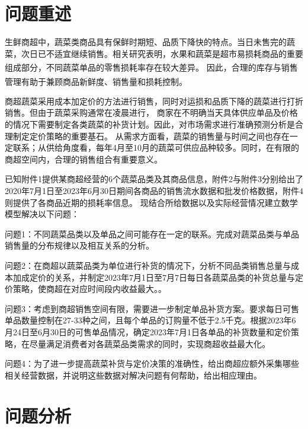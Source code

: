 \documentclass[withoutpreface,bwprint]{cumcmthesis} %
\numberwithin{equation}{section}
\begin{document}


\section{问题重述}

生鲜商超中，蔬菜类商品具有保鲜时期短、品质下降快的特点。当日未售完的蔬菜，次日已不适宜继续销售。相关研究表明，水果和蔬菜是超市易损耗商品的重要组成部分，不同蔬菜单品的零售损耗率存在较大差异\textsuperscript{\cite{buzby2015produce}}。
因此，合理的库存与销售管理有助于兼顾商品新鲜度、销售量和损耗控制\textsuperscript{\cite{broekmeulen2019foodwaste}}。

商超蔬菜采用成本加定价的方法进行销售，同时对运损和品质下降的蔬菜进行打折销售。但由于蔬菜采购通常在凌晨进行，
商家在不明确当天具体供应单品及价格的情况下需要制定各类蔬菜的补货计划。因此，对市场需求进行准确预测分析是合理制定定价策略的重要基石。
从需求方面看，蔬菜的销售量与时间之间也存在一定联系；从供给角度看，每年4月至10月的蔬菜可供应品种较多。同时，在有限的商超空间内，合理的销售组合有重要意义。

已知附件1提供某商超经营的6个蔬菜品类及其商品信息，附件2与附件3分别给出了2020年7月1日至2023年6月30日期间各商品的销售流水数据和批发价格数据，附件4则提供了各商品近期的损耗率信息。
现结合所给数据以及实际经营情况建立数学模型解决以下问题：

问题1：不同蔬菜品类以及单品之间可能存在一定的联系。完成对蔬菜品类与单品销售量的分布规律以及相互关系的分析。

问题2：在商超以蔬菜品类为单位进行补货的情况下，分析不同品类销售总量与成本加成定价的关系，并制定2023年7月1日至7月7日每日各蔬菜品类的补货总量与定价策略，使商超在对应时间段内收益最大。。

问题3：考虑到商超销售空间有限，需要进一步制定单品补货方案。要求每日可售单品数量控制在27-33种之间，且每个单品的订购量不低于2.5千克。根据2023年6月24日至6月30日的可售单品情况，确定2023年7月1日各单品的补货数量和定价策略，在尽量满足消费者对各蔬菜品类需求的同时，实现商超收益最大化。

问题4：为了进一步提高蔬菜补货与定价决策的准确性，给出商超应额外采集哪些相关经营数据，并说明这些数据对解决问题有何帮助，给出相应理由。
\section{问题分析}
\end{document}
